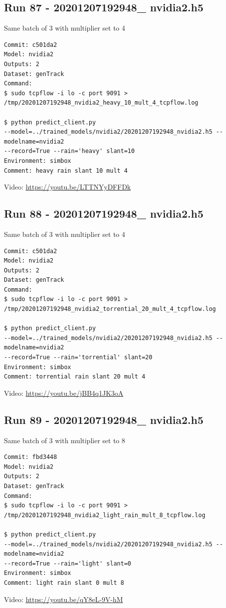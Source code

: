 \subsection{Run 87 - 20201207192948\_ nvidia2.h5 }
Same batch of 3 with multiplier set to 4
\label{app_res:87}
\begin{verbatim}
Commit: c501da2
Model: nvidia2 
Outputs: 2
Dataset: genTrack
Command:
$ sudo tcpflow -i lo -c port 9091 > 
/tmp/20201207192948_nvidia2_heavy_10_mult_4_tcpflow.log

$ python predict_client.py
--model=../trained_models/nvidia2/20201207192948_nvidia2.h5 --modelname=nvidia2 
--record=True --rain='heavy' slant=10
Environment: simbox
Comment: heavy rain slant 10 mult 4
\end{verbatim}
Video: \url{https://youtu.be/LTTNYyDFFDk}


\subsection{Run 88 - 20201207192948\_ nvidia2.h5 }
Same batch of 3 with multiplier set to 4
\label{app_res:88}
\begin{verbatim}
Commit: c501da2
Model: nvidia2 
Outputs: 2
Dataset: genTrack
Command:
$ sudo tcpflow -i lo -c port 9091 > 
/tmp/20201207192948_nvidia2_torrential_20_mult_4_tcpflow.log

$ python predict_client.py
--model=../trained_models/nvidia2/20201207192948_nvidia2.h5 --modelname=nvidia2 
--record=True --rain='torrential' slant=20
Environment: simbox
Comment: torrential rain slant 20 mult 4
\end{verbatim}
Video: \url{https://youtu.be/jBB4q1JK3oA}


\subsection{Run 89 - 20201207192948\_ nvidia2.h5 }
Same batch of 3 with multiplier set to 8
\label{app_res:89}
\begin{verbatim}
Commit: fbd3448
Model: nvidia2 
Outputs: 2
Dataset: genTrack
Command:
$ sudo tcpflow -i lo -c port 9091 > 
/tmp/20201207192948_nvidia2_light_rain_mult_8_tcpflow.log

$ python predict_client.py
--model=../trained_models/nvidia2/20201207192948_nvidia2.h5 --modelname=nvidia2 
--record=True --rain='light' slant=0
Environment: simbox
Comment: light rain slant 0 mult 8
\end{verbatim}
Video: \url{https://youtu.be/qY8eL-9V-hM}

